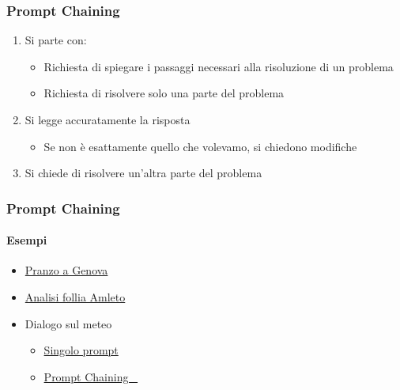 \begin{contentframe}
    \frametitle{Prompt Chaining}

    \begin{enumerate}
        \item Si parte con:
        \begin{itemize}
            \item Richiesta di spiegare i passaggi necessari alla risoluzione di un problema
            \item Richiesta di risolvere solo una parte del problema
        \end{itemize}

        \bigskip
        \item Si legge accuratamente la risposta
        \begin{itemize}
            \item Se non è esattamente quello che volevamo, si chiedono modifiche
        \end{itemize}
        
        \bigskip
        \item Si chiede di risolvere un'altra parte del problema
    \end{enumerate}
\end{contentframe}

\begin{exampleframe}
    \frametitle{Prompt Chaining}
    \framesubtitle{Esempi}

    \begin{itemize}
        \item \href{https://chatgpt.com/share/67618531-ffa0-8003-9b5c-a3901716ad68}{Pranzo a Genova}

        \bigskip
        \item \href{https://chatgpt.com/share/67617f2f-1fa8-8003-bbd3-50c23bcec90a}{Analisi follia Amleto}

        \bigskip
        \item Dialogo sul meteo
        \begin{itemize}
            \item \href{https://chatgpt.com/share/675b09fd-aeb8-8003-a291-b04cea1f17c8}{Singolo prompt \faSun}
            \item \href{https://chatgpt.com/share/675b098d-61b4-8003-881e-ba8f277e70b8}{Prompt Chaining \faWind~\faCloudShowersHeavy}
        \end{itemize}
    \end{itemize}
\end{exampleframe}

